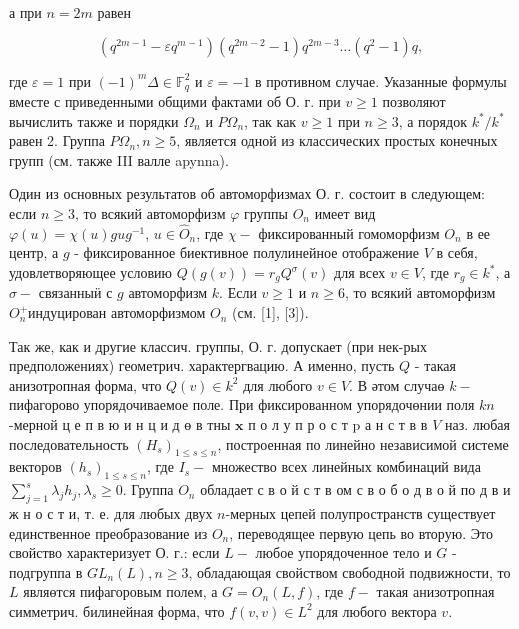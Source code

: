 \documentclass[10pt]{article}
\begin{document}
а при $n=2 m$ равен

\[
\left(q^{2 m-1}-\varepsilon q^{m-1}\right)\left(q^{2 m-2}-1\right) q^{2 m-3} \ldots\left(q^{2}-1\right) q,
\]

где $\varepsilon=1$ при $(-1)^{m} \Delta \in \mathbb{F}_{q}^{2}$ и $\varepsilon=-1$ в противном случае. Указанные формулы вместе с приведенными общими фактами об О. г. при $v \geqslant 1$ позволяют вычислить также и порядки $\Omega_{n}$ и $P \Omega_{n}$, так как $v \geqslant 1$ при $n \geqslant 3$, а порядок $k^{*} / k^{*}$ равен 2. Группа $P \Omega_{n}, n \geqslant 5$, является одной из классических простых конечных групп (см. также III валле apynna).

Один из основных результатов об автоморфизмах О. г. состоит в следующем: если $n \geqslant 3$, то всякий автоморфизм $\varphi$ группы $O_{n}$ имеет вид $\varphi(u)=\chi(u) g u g^{-1}$, $u \in \hat{O}_{n}$, где $\chi-$ фиксированный гомоморфизм $O_{n}$ в ее центр, а $g$ - фиксированное биективное полулинейное отображение $V$ в себя, удовлетворяющее условию $Q(g(v))=r_{g} Q^{\sigma}(v)$ для всех $v \in V$, где $r_{g} \in k^{*}$, а $\sigma-$ связанныӥ с $g$ автоморфизм $k$. Если $v \geqslant 1$ и $n \geqslant 6$, то всякий автоморфизм $O_{n}^{+}$индуцирован автоморфизмом $O_{n}$ (см. [1], [3]).

Так же, как и другие классич. группы, О. г. допускает (при нек-рых предположениях) геометрич. характергвацию. А именно, пусть $Q$ - такая анизотропная форма, что $Q(v) \in k^{2}$ для любого $v \in V$. В әтом случаө $k-$ пифагорово упорядочиваемое поле. При фиксированном упорядочөнии поля $k n$-мерной ц е п в ю и н ц и д ө в тны $\mathbf{x}$ п о л у п р о с т $\mathrm{p}$ а н с т в в $V$ наз. любая последовательность $\left(H_{s}\right)_{1 \leqslant s \leqslant n}$, построенная по линейно независимой системе векторов $\left(h_{s}\right)_{1 \leqslant s \leqslant n}$, где $I_{s}-$ множество всех линейных комбинаций вида $\sum_{j=1}^{s} \lambda_{j} h_{j}, \lambda_{s} \geqslant 0$. Группа $O_{n}$ обладает с в о й с т в ом с в о б о д в о й по д в и ж н о с т и, т. е. для любых двух $n$-мерных цепей полупространств существует единственное преобразование из $O_{n}$, переводящее первую цепь во вторую. Это свойство характеризует О. г.: если $L-$ любое упорядоченное тело и $G$ - подгруппа в $G L_{n}(L), n \geqslant 3$, обладающая свойством свободной подвижности, то $L$ являөтся пифагоровым полем, а $G=O_{n}(L, f)$, где $f-$ такая анизотропная симметрич. билинейная форма, что $f(v, v) \in L^{2}$ для любого вектора $v$.
\end{document}
